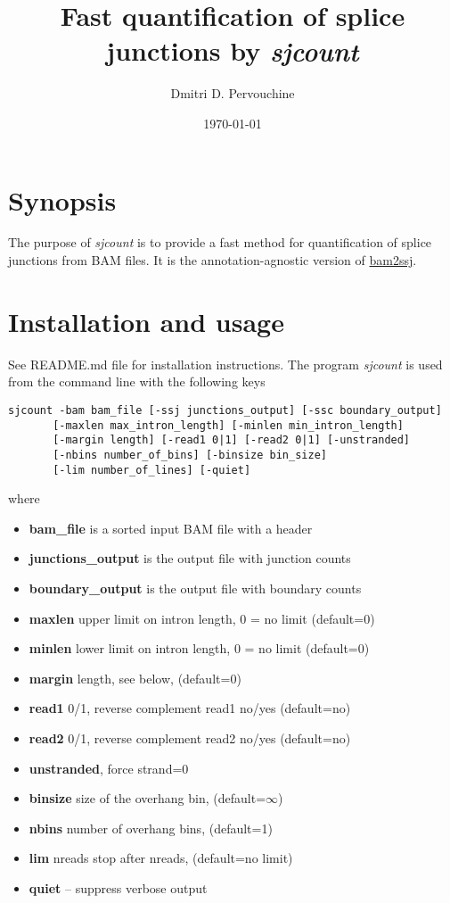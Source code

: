 \documentclass{article}
\begin{document}
\title{Fast quantification of splice junctions by {\em sjcount}}
\author{Dmitri D. Pervouchine}
\date{\today}
\maketitle

\section{Synopsis}

The purpose of {\em sjcount} is to provide a fast method for quantification of splice junctions from BAM files. It is the annotation-agnostic version of 
\href{https://github.com/pervouchine/bam2ssj}{bam2ssj}.


\section{Installation and usage}

See README.md file for installation instructions. The program {\em sjcount} is used from the command line with the following keys

\begin{verbatim}
sjcount -bam bam_file [-ssj junctions_output] [-ssc boundary_output]
       [-maxlen max_intron_length] [-minlen min_intron_length] 
       [-margin length] [-read1 0|1] [-read2 0|1] [-unstranded] 
       [-nbins number_of_bins] [-binsize bin_size] 
       [-lim number_of_lines] [-quiet]
\end{verbatim}
where
\begin{itemize}
\item {\bf bam\_file} is a sorted input BAM file with a header
\item {\bf junctions\_output} is the output file with junction counts
\item {\bf boundary\_output} is the output file with boundary counts
\item {\bf maxlen} upper limit on intron length, 0 = no limit (default=0)
\item {\bf minlen} lower limit on intron length, 0 = no limit (default=0)
\item {\bf margin} length, see below, (default=0)
\item {\bf read1} 0/1, reverse complement read1 no/yes (default=no)
\item {\bf read2} 0/1, reverse complement read2 no/yes (default=no)
\item {\bf unstranded}, force strand=0
\item {\bf binsize} size of the overhang bin, (default=$\infty$)
\item {\bf nbins} number of overhang bins, (default=1)
\item {\bf lim} nreads stop after nreads, (default=no limit)
\item {\bf quiet} -- suppress verbose output
\end{itemize}
\end{document}
